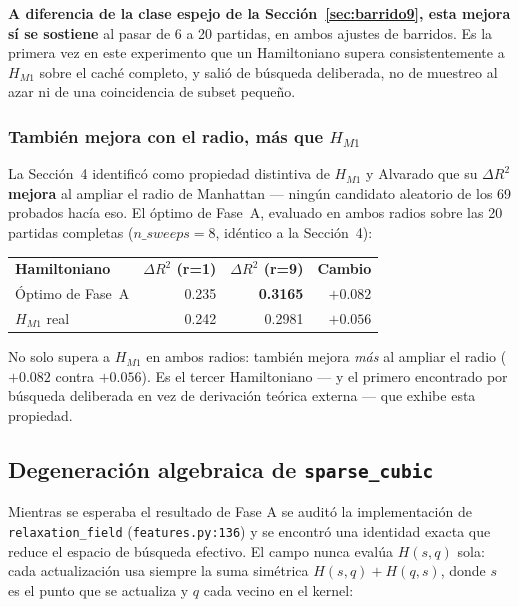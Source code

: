 \documentclass[11pt, a4paper]{article}
\newcommand{\TH}[1]{\cellcolor{cTHbg}\color{white}\textbf{#1}}
\newcommand{\good}[1]{\color{cGood}\textbf{#1}}
\begin{document}
\begin{tcolorbox}[quotebox]
  \textbf{A diferencia de la clase espejo de la
  Secci\'on~\ref{sec:barrido9}, esta mejora s\'i se sostiene} al pasar
  de 6 a 20 partidas, en ambos ajustes de barridos. Es la primera vez
  en este experimento que un Hamiltoniano supera consistentemente a
  $H_{M1}$ sobre el cach\'e completo, y sali\'o de b\'usqueda
  deliberada, no de muestreo al azar ni de una coincidencia de subset
  peque\~no.
\end{tcolorbox}

\subsubsection{Tambi\'en mejora con el radio, m\'as que $H_{M1}$}

La Secci\'on~4 identific\'o como propiedad distintiva de $H_{M1}$ y
Alvarado que su $\Delta R^2$ \textbf{mejora} al ampliar el radio de
Manhattan --- ning\'un candidato aleatorio de los 69 probados hac\'ia
eso. El \'optimo de Fase~A, evaluado en ambos radios sobre las 20
partidas completas ($n\_sweeps=8$, id\'entico a la Secci\'on~4):

\medskip
\begin{center}
\begin{tabular}{lrrr}
  \TH{Hamiltoniano} & \TH{$\Delta R^2$ (r=1)} & \TH{$\Delta R^2$ (r=9)} & \TH{Cambio} \\[1pt]
  \'Optimo de Fase~A & 0.235 & \good{0.3165} & \good{$+0.082$} \\
  $H_{M1}$ real       & 0.242 & 0.2981          & $+0.056$ \\
\end{tabular}
\end{center}
\medskip

No solo supera a $H_{M1}$ en ambos radios: tambi\'en mejora \emph{m\'as}
al ampliar el radio ($+0.082$ contra $+0.056$). Es el tercer
Hamiltoniano --- y el primero encontrado por b\'usqueda deliberada en
vez de derivaci\'on te\'orica externa --- que exhibe esta propiedad.

\subsection{Degeneraci\'on algebraica de \texttt{sparse\_cubic}}
\label{sec:degeneracion}

Mientras se esperaba el resultado de Fase A se audit\'o la
implementaci\'on de \texttt{relaxation\_field} (\texttt{features.py:136})
y se encontr\'o una identidad exacta que reduce el espacio de
b\'usqueda efectivo. El campo nunca eval\'ua $H(s,q)$ sola: cada
actualizaci\'on usa siempre la suma sim\'etrica $H(s,q)+H(q,s)$, donde
$s$ es el punto que se actualiza y $q$ cada vecino en el kernel:
\end{document}
